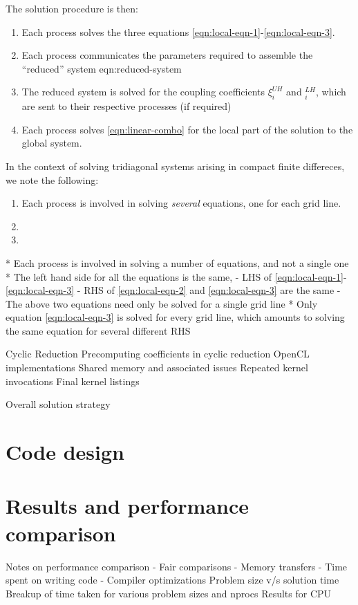 \documentclass{article}
\begin{document}
    The solution procedure is then:

    \begin{enumerate}
        \item Each process solves the three equations
        \ref{eqn:local-eqn-1}-\ref{eqn:local-eqn-3}.
        \item Each process communicates the parameters required to
        assemble the ``reduced'' system eqn:reduced-system
        \item The reduced system is solved for the coupling coefficients
        $\xi_i^{UH}$ and $_i^{LH}$, which are sent to their respective processes
        (if required)
        \item Each process solves \ref{eqn:linear-combo} for the local part
        of the solution to the global system.
    \end{enumerate}

    In the context of solving tridiagonal systems arising in compact finite differeces,
    we note the following:

    \begin{enumerate}
        \item Each process is involved in solving \emph{several} equations,
            one for each grid line.
        \item
        \item
    \end{enumerate}


    * Each process is involved in solving a number of equations, and not a single one
    * The left hand side for all the equations is the same,
        - LHS of \ref{eqn:local-eqn-1}-\ref{eqn:local-eqn-3}
        - RHS of \ref{eqn:local-eqn-2} and \ref{eqn:local-eqn-3} are the same
        - The above two equations need only be solved for a single grid line
    * Only equation \ref{eqn:local-eqn-3} is solved for every grid line,
    which amounts to solving the same equation for several different RHS

    Cyclic Reduction
    Precomputing coefficients in cyclic reduction
    OpenCL implementations
    Shared memory and associated issues
    Repeated kernel invocations
    Final kernel listings

    Overall solution strategy


\section{Code design}

\section{Results and performance comparison}
    Notes on performance comparison
        - Fair comparisons
        - Memory transfers
        - Time spent on writing code
        - Compiler optimizations
    Problem size v/s solution time
    Breakup of time taken for various problem sizes and nprocs
    Results for CPU
\end{document}
